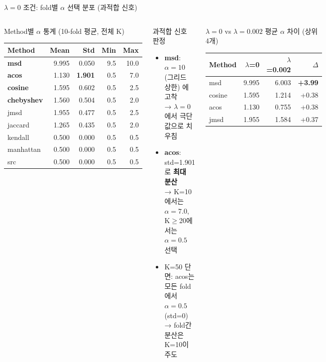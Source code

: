 \documentclass[aspectratio=169,10pt]{beamer}
\begin{document}
\begin{frame}[shrink=5]{$\lambda=0$ 조건: fold별 $\alpha$ 선택 분포 (과적합 신호)}
	\begin{columns}[T]
			\begin{block}{Method별 $\alpha$ 통계 (10-fold 평균, 전체 K)}
				\begin{tabular}{lrrrr}
					\toprule
					Method & Mean & Std & Min & Max \\
					\midrule
					\textbf{msd}     & 9.995 & 0.050 & 9.5 & 10.0 \\
					\textbf{acos}    & 1.130 & \textbf{1.901} & 0.5 & 7.0 \\
					\textbf{cosine}  & 1.595 & 0.602 & 0.5 & 2.5 \\
					\textbf{chebyshev} & 1.560 & 0.504 & 0.5 & 2.0 \\
					jmsd     & 1.955 & 0.477 & 0.5 & 2.5 \\
					jaccard  & 1.265 & 0.435 & 0.5 & 2.0 \\
					kendall  & 0.500 & 0.000 & 0.5 & 0.5 \\
					manhattan & 0.500 & 0.000 & 0.5 & 0.5 \\
					src      & 0.500 & 0.000 & 0.5 & 0.5 \\
					\bottomrule
				\end{tabular}
			\end{block}

			\begin{alertblock}{과적합 신호 판정}
				\begin{itemize}
					\item \textbf{msd}: $\alpha=10$ (그리드 상한) 에 고착 \\ \small → $\lambda=0$에서 극단값으로 치우침
					\item \textbf{acos}: std=1.901 로 \textbf{최대 분산} \\ \small → K=10에서는 $\alpha=7.0$, K$\geq$20에서는 $\alpha=0.5$ 선택
					\item K=50 단면: acos는 모든 fold에서 $\alpha=0.5$ (std=0) \\ \small → fold간 분산은 K=10이 주도
				\end{itemize}
			\end{alertblock}
			\begin{block}{$\lambda=0$ vs $\lambda=0.002$ 평균 $\alpha$ 차이 (상위 4개)}
				\small
				\begin{tabular}{lrrr}
					Method & $\lambda$=0 & $\lambda$=0.002 & $\Delta$ \\
					\midrule
					msd    & 9.995 & 6.003 & \textbf{+3.99} \\
					cosine & 1.595 & 1.214 & +0.38 \\
					acos   & 1.130 & 0.755 & +0.38 \\
					jmsd   & 1.955 & 1.584 & +0.37 \\
				\end{tabular}
			\end{block}
	\end{columns}
\end{frame}
\end{document}

